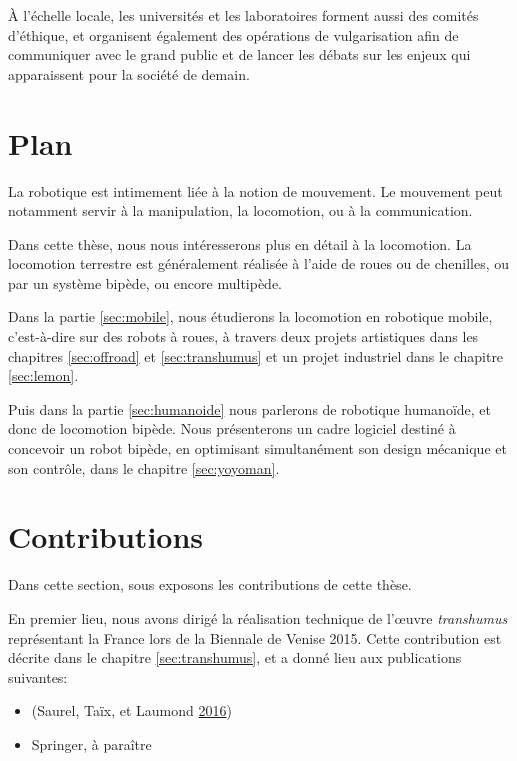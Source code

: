 \documentclass[french,A4paper,]{book}
\providecommand{\tightlist}{%
  \setlength{\itemsep}{0pt}\setlength{\parskip}{0pt}}
\begin{document}
À l'échelle locale, les universités et les laboratoires forment aussi
des comités d'éthique, et organisent également des opérations de
vulgarisation afin de communiquer avec le grand public et de lancer les
débats sur les enjeux qui apparaissent pour la société de demain.

\section{Plan}\label{sec:plan}

La robotique est intimement liée à la notion de mouvement. Le mouvement
peut notamment servir à la manipulation, la locomotion, ou à la
communication.

Dans cette thèse, nous nous intéresserons plus en détail à la
locomotion. La locomotion terrestre est généralement réalisée à l'aide
de roues ou de chenilles, ou par un système bipède, ou encore multipède.

Dans la partie \ref{sec:mobile}, nous étudierons la locomotion en
robotique mobile, c'est-à-dire sur des robots à roues, à travers deux
projets artistiques dans les chapitres \ref{sec:offroad} et
\ref{sec:transhumus} et un projet industriel dans le chapitre
\ref{sec:lemon}.

Puis dans la partie \ref{sec:humanoide} nous parlerons de robotique
humanoïde, et donc de locomotion bipède. Nous présenterons un cadre
logiciel destiné à concevoir un robot bipède, en optimisant
simultanément son design mécanique et son contrôle, dans le chapitre
\ref{sec:yoyoman}.

\section{Contributions}\label{sec:contributions}

Dans cette section, sous exposons les contributions de cette thèse.

En premier lieu, nous avons dirigé la réalisation technique de l'œuvre
\emph{transhumus} représentant la France lors de la Biennale de Venise
2015. Cette contribution est décrite dans le chapitre
\ref{sec:transhumus}, et a donné lieu aux publications suivantes:

\begin{itemize}
\tightlist
\item
  (Saurel, Taïx, et Laumond \protect\hyperlink{ref-transhumus}{2016})
\item
  Springer, à paraître
\end{itemize}
\end{document}
